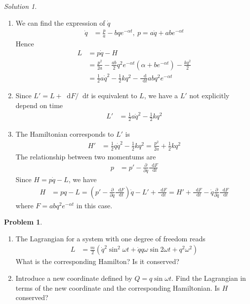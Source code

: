 \documentclass[twoside,11pt]{article}
\newcommand{\lms}{\fontfamily{lmss}\selectfont} %
\renewcommand*\d{\mathop{}\!\mathrm{d}}
\theoremstyle{definition}
\newtheorem{problem}{\lms Problem}
\theoremstyle{remark}
\newtheorem*{solution}{Solution}
\begin{document}
\begin{solution}~
\begin{enumerate}[label=\alph*)]
\item We can find the expression of $\dot q$
\begin{align*}
    \dot q &= \frac{p}{a} - bqe^{-\alpha t},~
    p = a\dot q + abe^{-\alpha t}
\end{align*}
Hence
\begin{align*}
    L &= p\dot q - H\\
      &= \frac{p^2}{2a} - \frac{ab}{2}q^2e^{-\alpha t}(\alpha + be^{-\alpha t})
      - \frac{kq^2}{2}\\
      &= \frac{1}{2}a\dot q^2 - \frac{1}{2}kq^2
      - \frac{\d }{\d t} abq^2e^{-\alpha t}
\end{align*}

\item Since $L' = L + \d F/\d t$ is equivalent to $L$, we have a $L'$ 
not explicitly depend on time
\begin{align*}
    L' &= \frac{1}{2}a\dot q^2 - \frac{1}{2}kq^2
\end{align*}

\item The Hamiltonian corresponds to $L'$ is
\begin{align*}
    H' &= \frac{1}{2}q\dot q^2 - \frac{1}{2}kq^2
    = \frac{p^2}{2a} + \frac{1}{2}kq^2
\end{align*}
The relationship between two momentums are
\begin{align*}
    p &= p' - \frac{\partial}{\partial\dot q}\frac{\d F}{\d t}
\end{align*}
Since $H=p\dot q - L$, we have
\begin{align*}
    H &= pq - L
    = \left( 
        p' - \frac{\partial}{\partial\dot q}
        \frac{\d F}{\d t}
    \right)\dot q - L' + \frac{\d F}{\d t}
    = H' + \frac{\d F}{\d t} - \dot q \frac{\partial}{\partial\dot q}
    \frac{\d F}{\d t}
\end{align*}
where $F = abq^2e^{-\alpha t}$ in this case.

\end{enumerate}
\end{solution}



\begin{problem}~
\begin{enumerate}[label=\alph*)]
\item The Lagrangian for a system with one degree of freedom reads
\begin{align}
    L &= \frac{m}{2}(\dot q^2\sin^2\omega t + \dot qq\omega\sin2\omega t
    + q^2\omega^2)
\end{align}
What is the corresponding Hamilton? Is it conserved?

\item Introduce a new coordinate defined by $Q=q\sin\omega t$.
Find the Lagrangian in terms of the new coordinate and the corresponding
Hamiltonian. Is $H$ conserved?
\end{enumerate}
\end{problem}
\end{document}
